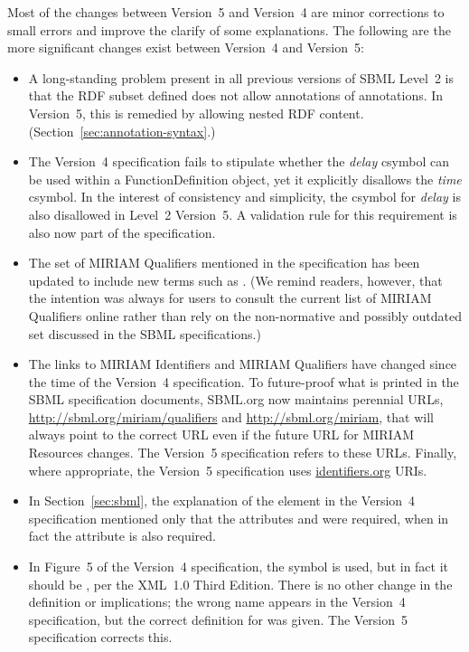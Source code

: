Most of the changes between Version~5 and Version~4 are minor
corrections to small errors and improve the clarify of some
explanations.  The following are the more significant changes
exist between Version~4 and Version~5:
\begin{itemize}

\item A long-standing problem present in all previous versions of
  SBML Level~2 is that the RDF subset defined does not allow
  annotations of annotations.  In Version~5, this is remedied by
  allowing nested RDF content.
  (Section~\ref{sec:annotation-syntax}.)

\item The Version~4 specification fails to stipulate whether the
  \emph{delay} csymbol can be used within a FunctionDefinition
  object, yet it explicitly disallows the \emph{time} csymbol. In
  the interest of consistency and simplicity, the csymbol for
  \emph{delay} is also disallowed in Level~2 Version~5.  A
  validation rule for this requirement is also now part of the
  specification.

\item The set of MIRIAM Qualifiers mentioned in the specification
  has been updated to include new terms such as .
  (We remind readers, however, that the intention was always for
  users to consult the current list of MIRIAM Qualifiers online
  rather than rely on the non-normative and possibly outdated set
  discussed in the SBML specifications.)

\item The links to MIRIAM Identifiers and MIRIAM Qualifiers have
  changed since the time of the Version~4 specification. To
  future-proof what is printed in the SBML specification
  documents, SBML.org now maintains perennial URLs,
  \url{http://sbml.org/miriam/qualifiers} and
  \url{http://sbml.org/miriam}, that will always point to the
  correct URL even if the future URL for MIRIAM Resources changes.
  The Version~5 specification refers to these URLs.  Finally,
  where appropriate, the Version~5 specification uses
  \url{identifiers.org} URIs.

\item In Section~\ref{sec:sbml}, the explanation of the
   element in the Version~4 specification mentioned
  only that the attributes  and  were
  required, when in fact the attribute  is also
  required.

\item In Figure~5 of the Version~4 specification, the symbol
   is used, but in fact it should be
  , per the XML~1.0 Third Edition. There is no
  other change in the definition or implications; the wrong name
  appears in the Version~4 specification, but the correct
  definition for  was given.  The Version~5
  specification corrects this.


\end{itemize}
